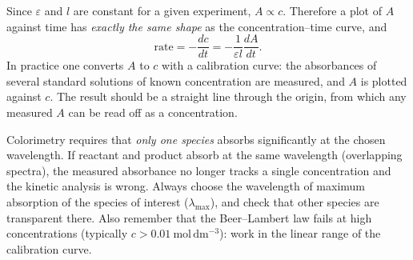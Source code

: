 \documentclass[11pt]{article}
\newcommand{\cle}[1]{{\popxbold\color{popdark}#1}}
\begin{document}
\begin{propriete}
Since $\varepsilon$ and $l$ are constant for a given experiment, $A \propto c$. Therefore a plot of $A$ against time has \emph{exactly the same shape} as the concentration--time curve, and
\[
\text{rate} = -\frac{dc}{dt} = -\frac{1}{\varepsilon l}\frac{dA}{dt}.
\]
In practice one converts $A$ to $c$ with a \cle{calibration curve}: the absorbances of several standard solutions of known concentration are measured, and $A$ is plotted against $c$. The result should be a straight line through the origin, from which any measured $A$ can be read off as a concentration.
\end{propriete}

\begin{attention}
Colorimetry requires that \emph{only one species} absorbs significantly at the chosen wavelength. If reactant and product absorb at the same wavelength (overlapping spectra), the measured absorbance no longer tracks a single concentration and the kinetic analysis is wrong. Always choose the wavelength of maximum absorption of the species of interest ($\lambda_{\max}$), and check that other species are transparent there. Also remember that the Beer--Lambert law fails at high concentrations (typically $c > 0.01\ \mathrm{mol\,dm^{-3}}$): work in the linear range of the calibration curve.
\end{attention}
\end{document}
